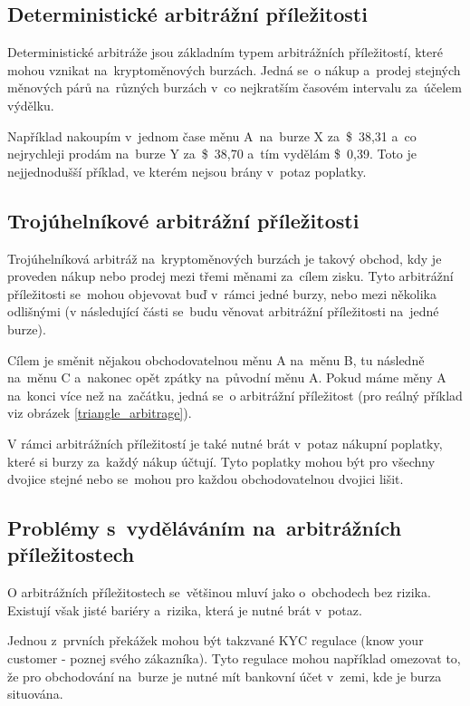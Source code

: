 \documentclass[thesis=B,czech]{FITthesis}[2019/03/21]
\begin{document}
\subsection{Deterministické arbitrážní příležitosti}
Deterministické arbitráže jsou základním typem arbitrážních příležitostí, které mohou vznikat na~kryptoměnových burzách. Jedná se~o nákup a~prodej \linebreak stejných měnových párů na~různých burzách v~co nejkratším časovém intervalu za~účelem výdělku. \cite{CZInvestor} \cite{TowardsDataScience}

Například nakoupím v~jednom čase měnu A~na~burze X za~\$~38,31 a~co nejrychleji prodám na~burze Y za~\$~38,70 a~tím vydělám  \$~0,39. Toto je nejjednodušší příklad, ve kterém nejsou brány v~potaz poplatky. 

\subsection{Trojúhelníkové arbitrážní příležitosti}
Trojúhelníková arbitráž na~kryptoměnových burzách je takový obchod, kdy je proveden nákup nebo prodej mezi třemi měnami za~cílem zisku. Tyto arbitrážní příležitosti se~mohou objevovat buď v~rámci jedné burzy, nebo mezi několika odlišnými (v následující části se~budu věnovat arbitrážní příležitosti na~jedné burze). \cite{TradingStrategy}

Cílem je směnit nějakou obchodovatelnou měnu A na~měnu B, tu následně na~měnu C a~nakonec opět zpátky na~původní měnu A. Pokud máme měny A na~konci více než na~začátku, jedná se~o arbitrážní příležitost (pro reálný příklad viz obrázek \ref{triangle_arbitrage}).

V rámci arbitrážních příležitostí je také nutné brát v~potaz nákupní poplatky, které si burzy za~každý nákup účtují. Tyto poplatky mohou být pro všechny dvojice stejné nebo se~mohou pro každou obchodovatelnou dvojici lišit.  

\subsection{Problémy s~vyděláváním na~arbitrážních příležitostech}
O arbitrážních příležitostech se~většinou mluví jako o~obchodech bez rizika. Existují však jisté bariéry a~rizika, která je nutné brát v~potaz.

Jednou z~prvních překážek mohou být takzvané KYC regulace (know your customer - poznej svého zákazníka). Tyto regulace mohou například omezovat to, že pro obchodování na~burze je nutné mít bankovní účet v~zemi, kde je burza situována.
\end{document}
